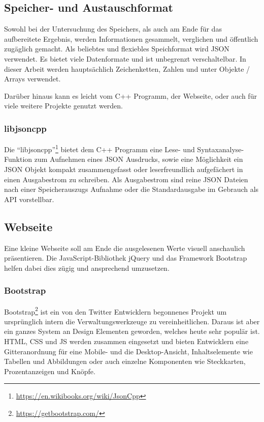 \subsection{Speicher- und Austauschformat}
Sowohl bei der Untersuchung des Speichers, als auch am Ende für das aufbereitete Ergebnis, werden Informationen gesammelt, verglichen und öffentlich zugäglich gemacht.
Als beliebtes und flexiebles Speichformat wird \ac{JSON} verwendet.
Es bietet viele Datenformate und ist unbegrenzt verschaltelbar.
In dieser Arbeit werden hauptsächlich Zeichenketten, Zahlen und unter Objekte / Arrays verwendet.

Darüber hinaus kann es leicht vom C++ Programm, der Webseite, oder auch für viele weitere Projekte genutzt werden.

\subsubsection{libjsoncpp}
Die "`libjsoncpp"'\footnote{\url{https://en.wikibooks.org/wiki/JsonCpp}} bietet dem C++ Programm eine Lese- und Syntaxanalyse-Funktion zum Aufnehmen eines \ac{JSON} Ausdrucks, sowie eine Möglichkeit ein \ac{JSON} Objekt kompakt zusammengefasst oder leserfreundlich aufgefächert in einen Ausgabestrom zu schreiben.
Als Ausgabestrom sind reine \ac{JSON} Dateien nach einer Speicherauszugs Aufnahme oder die Standardausgabe im Gebrauch als API vorstellbar.


\subsection{Webseite}
Eine kleine Webseite soll am Ende die ausgelesenen Werte visuell anschaulich präsentieren.
Die JavaScript-Bibliothek jQuery und das Framework Bootstrap helfen dabei dies zügig und ansprechend umzusetzen.

\subsubsection{Bootstrap}
Bootstrap\footnote{\url{https://getbootstrap.com/}} ist ein von den Twitter Entwicklern begonnenes Projekt um ursprünglich intern die Verwaltungswerkzeuge zu vereinheitlichen.
Daraus ist aber ein ganzes System an Design Elementen geworden, welches heute sehr populär ist.
\ac{HTML}, \ac{CSS} und \ac{JS} werden zusammen eingesetzt und bieten Entwicklern eine Gitteranordnung für eine Mobile- und die Desktop-Ansicht, Inhaltselemente wie Tabellen und Abbildungen oder auch einzelne Komponenten wie Steckkarten, Prozentanzeigen und Knöpfe.

